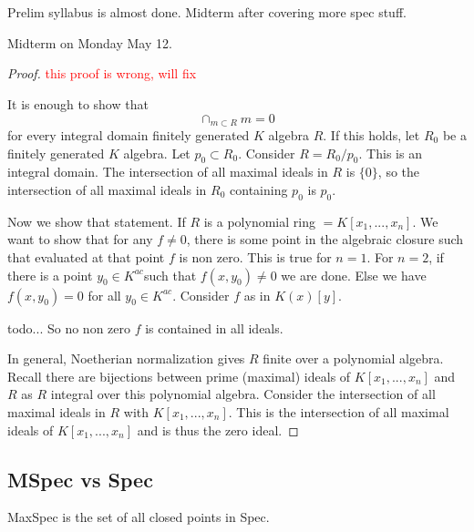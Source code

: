 \section{}
Prelim syllabus is almost done. Midterm after covering more spec stuff.

Midterm on Monday May 12. 


\begin{proof}
    \textcolor{red}{this proof is wrong, will fix}

    It is enough to show that\[
    \cap_{m\subset R} m = 0
    \]
    for every integral domain finitely generated $K$ algebra $R$. If this holds, let $R_0$ be a finitely generated $K$ algebra. Let $p_0\subset R_0$. Consider $R=R_0/p_0$. This is an integral domain. The intersection of all maximal ideals in $R$ is $\{0\}$, so the intersection of all maximal ideals in $R_0$ containing $p_0$ is $p_0$.



    Now we show that statement. If $R$ is a polynomial ring $=K[x_1,...,x_n]$. We want to show that for any $f\neq 0$, there is some point in the algebraic closure such that evaluated at that point $f$ is non zero. This is true for $n=1$. For $n=2$, if there is a point $y_0\in K^{ac}$such that $f(x,y_0)\neq 0 $ we are done. Else we have $f(x,y_0)=0$ for all $y_0\in K^{ac}$. Consider $f$ as in $K(x)[y]$. 


    todo... So no non zero $f$ is contained in all ideals.


    In general, Noetherian normalization gives $R$ finite over a polynomial algebra. Recall there are bijections between prime (maximal) ideals of $K[x_1,...,x_n]$ and $R$ as $R$ integral over this polynomial algebra. Consider the intersection of all maximal ideals in $R$ with $K[x_1,...,x_n]$. This is the intersection of all maximal ideals of $K[x_1,...,x_n]$ and is thus the zero ideal.
\end{proof}

\subsection*{MSpec vs Spec}

MaxSpec is the set of all closed points in Spec.

